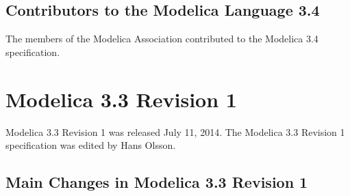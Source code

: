 \subsection{Contributors to the Modelica Language 3.4}\label{contributors-to-the-modelica-language-3-4}

The members of the Modelica Association contributed to the Modelica 3.4
specification.

\section{Modelica 3.3 Revision 1}\label{modelica-3-3-revision-1}

Modelica 3.3 Revision 1 was released July 11, 2014. The Modelica 3.3
Revision 1 specification was edited by Hans Olsson.

\subsection{Main Changes in Modelica 3.3 Revision 1}\label{main-changes-in-modelica-3-3-revision-1}

